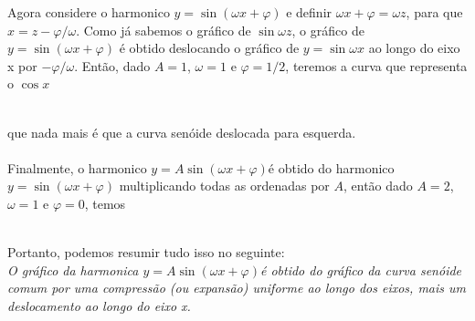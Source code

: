 \documentclass{article}
\newcommand{\senoide}{\mbox{$y = A\sin{(\omega x + \varphi)}$}}
\begin{document}
Agora considere o harmonico $y = \sin{(\omega x + \varphi)}$ e definir $\omega x + \varphi = \omega z$,
para que $x = z - \varphi/\omega$. Como já sabemos o gráfico de $\sin{\omega z}$, o gráfico 
de $y = \sin{(\omega x + \varphi)}$ é obtido deslocando o gráfico de $y = \sin{\omega x}$ ao
longo do eixo x por $-\varphi/\omega$. Então, dado $A = 1$, $\omega = 1$ e $\varphi = 1/2$,
teremos a curva que representa o $\cos{x}$\\
\\
que nada mais é que a curva senóide deslocada para esquerda.\\
\\
Finalmente, o harmonico \senoide é obtido do harmonico $y = \sin{(\omega x + \varphi)}$
multiplicando todas as ordenadas por $A$, então dado $A = 2$, $\omega = 1$ e $\varphi = 0$,
temos\\
\\
Portanto, podemos resumir tudo isso no seguinte:\\
\textit{ O gráfico da harmonica \senoide é obtido do gráfico da curva
senóide comum por uma compressão (ou expansão) uniforme ao longo dos eixos,
mais um deslocamento ao longo do eixo x.}\\
\end{document}
